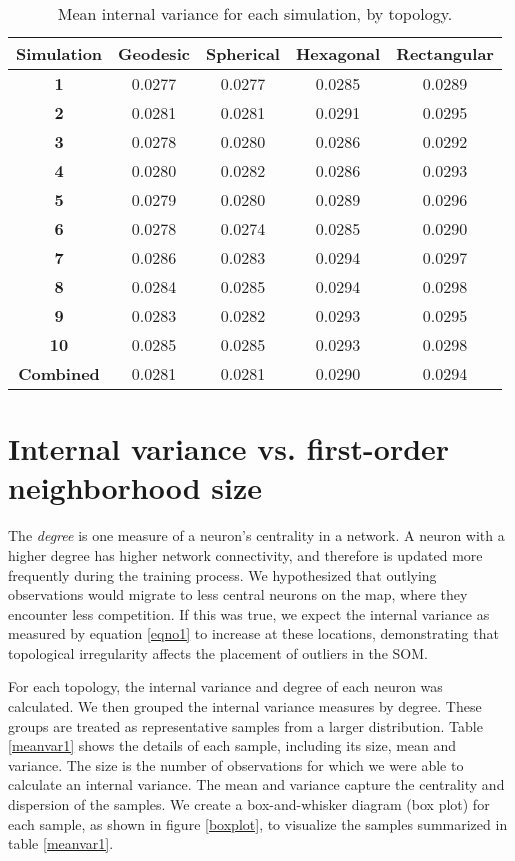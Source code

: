 \begin{table}[hbt]
\centering
\caption{Mean internal variance for each simulation, by topology.}
\label{ivtable3}
\begin{tabular}{|c||c|c|c|c|}
\hline
\textbf{Simulation} & Geodesic & Spherical & Hexagonal & Rectangular \\
\hline
\hline
\textbf{1} & 0.0277 & 0.0277 & 0.0285 & 0.0289 \\
\textbf{2} & 0.0281 & 0.0281 & 0.0291 & 0.0295 \\
\textbf{3} & 0.0278 & 0.0280 & 0.0286 & 0.0292 \\
\textbf{4} & 0.0280 & 0.0282 & 0.0286 & 0.0293 \\
\textbf{5} & 0.0279 & 0.0280 & 0.0289 & 0.0296 \\
\textbf{6} & 0.0278 & 0.0274 & 0.0285 & 0.0290 \\
\textbf{7} & 0.0286 & 0.0283 & 0.0294 & 0.0297 \\
\textbf{8} & 0.0284 & 0.0285 & 0.0294 & 0.0298 \\
\textbf{9} & 0.0283 & 0.0282 & 0.0293 & 0.0295 \\
\textbf{10}& 0.0285 & 0.0285 & 0.0293 & 0.0298 \\
\hline
\hline
\textbf{Combined} & 0.0281 & 0.0281 & 0.0290 & 0.0294\\
\hline
\end{tabular} \end{table}

\section{Internal variance vs. first-order neighborhood size}
\label{rdq1}
The \emph{degree} is one measure of a neuron's centrality in a network. A
neuron with a higher degree has higher network connectivity, and therefore is
updated more frequently during the training process.  We hypothesized that
outlying observations would migrate to less central neurons on the map, where
they encounter less competition.  If this was true, we expect the internal variance
as measured by equation \ref{eqno1} to increase at these locations,
demonstrating that topological irregularity affects the placement of outliers
in the SOM.  

For each topology, the internal variance and degree of each neuron was
calculated. We then grouped the internal variance measures by degree.  These groups are
treated as representative samples from a larger distribution. Table \ref{meanvar1}
shows the details of each sample, including its size, mean and variance. 
The size is the number of observations for which we were able to calculate an
internal variance. The mean and variance capture the centrality and
dispersion of the samples.  We create a box-and-whisker diagram (box plot) for
each sample, as shown in figure \ref{boxplot}, to visualize the samples
summarized in table \ref{meanvar1}.

